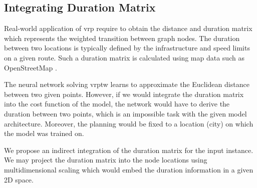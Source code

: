     
    \subsection{Integrating Duration Matrix}
    Real-world application of \gls{vrp} require to obtain the distance and duration matrix which represents the weighted transition between graph nodes. The duration between two locations is typically defined by the infrastructure and speed limits on a given route. Such a duration matrix is calculated using map data such as OpenStreetMap \cite{osm}.
    
    The neural network solving \gls{vrptw} learns to approximate the Euclidean distance between two given points. However, if we would integrate the duration matrix into the cost function of the model, the network would have to derive the duration between two points, which is an impossible task with the given model architecture. Moreover, the planning would be fixed to a location (city) on which the model was trained on.
    
    We propose an indirect integration of the duration matrix for the input instance. We may project the duration matrix into the node locations using multidimensional scaling \cite{mds} which would embed the duration information in a given 2D space.
